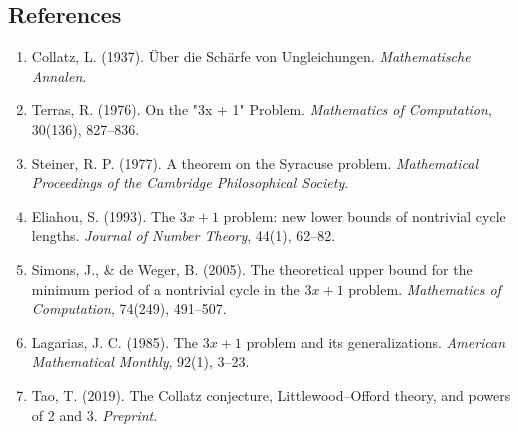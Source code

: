 \documentclass[12pt,a4paper]{article}
\begin{document}
\subsection{References}

\begin{enumerate}
    \item Collatz, L. (1937). Über die Schärfe von Ungleichungen. \emph{Mathematische Annalen}.
    \item Terras, R. (1976). On the "3x + 1" Problem. \emph{Mathematics of Computation}, 30(136), 827--836.
    \item Steiner, R. P. (1977). A theorem on the Syracuse problem. \emph{Mathematical Proceedings of the Cambridge Philosophical Society}.
    \item Eliahou, S. (1993). The $3x+1$ problem: new lower bounds of nontrivial cycle lengths. \emph{Journal of Number Theory}, 44(1), 62--82.
    \item Simons, J., \& de Weger, B. (2005). The theoretical upper bound for the minimum period of a nontrivial cycle in the $3x+1$ problem. \emph{Mathematics of Computation}, 74(249), 491--507.
    \item Lagarias, J. C. (1985). The $3x+1$ problem and its generalizations. \emph{American Mathematical Monthly}, 92(1), 3--23.
    \item Tao, T. (2019). The Collatz conjecture, Littlewood--Offord theory, and powers of 2 and 3. \emph{Preprint}.
\end{enumerate}
\end{document}
